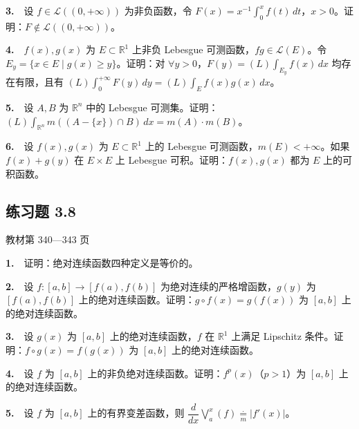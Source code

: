 \documentclass[11pt,a4paper]{article}
\begin{document}
\par{}\noindent \textbf{3.}　设 \(f\in\mathcal L((0,+\infty))\) 为非负函数，令 \(F(x)=x^{-1}\int_0^x f(t)\,dt\)，\(x>0\)。证明：\(F\notin\mathcal L((0,+\infty))\)。

\par{}\noindent \textbf{4.}　\(f(x),g(x)\) 为 \(E\subset\mathbb R^1\) 上非负 Lebesgue 可测函数，\(fg\in\mathcal L(E)\)。令 \(E_y=\{x\in E\mid g(x)\ge y\}\)。证明：对 \(\forall y>0\)，\(F(y)=(L)\int_{E_y} f(x)\,dx\) 均存在有限，且有 \((L)\int_0^{+\infty}F(y)\,dy=(L)\int_E f(x)g(x)\,dx\)。

\par{}\noindent \textbf{5.}　设 \(A,B\) 为 \(\mathbb R^n\) 中的 Lebesgue 可测集。证明：\((L)\int_{\mathbb R^n}m((A-\{x\})\cap B)\,dx=m(A)\cdot m(B)\)。

\par{}\noindent \textbf{6.}　设 \(f(x),g(x)\) 为 \(E\subset\mathbb R^1\) 上的 Lebesgue 可测函数，\(m(E)<+\infty\)。如果 \(f(x)+g(y)\) 在 \(E\times E\) 上 Lebesgue 可积。证明：\(f(x),g(x)\) 都为 \(E\) 上的可积函数。


\hypertarget{ex8}{}\subsection*{练习题 3.8}
\noindent 教材第 340—343 页

\par{}\noindent \textbf{1.}　证明：绝对连续函数四种定义是等价的。

\par{}\noindent \textbf{2.}　设 \(f:[a,b]\to[f(a),f(b)]\) 为绝对连续的严格增函数，\(g(y)\) 为 \([f(a),f(b)]\) 上的绝对连续函数。证明：\(g\circ f(x)=g(f(x))\) 为 \([a,b]\) 上的绝对连续函数。

\par{}\noindent \textbf{3.}　设 \(g(x)\) 为 \([a,b]\) 上的绝对连续函数，\(f\) 在 \(\mathbb R^1\) 上满足 Lipschitz 条件。证明：\(f\circ g(x)=f(g(x))\) 为 \([a,b]\) 上的绝对连续函数。

\par{}\noindent \textbf{4.}　设 \(f\) 为 \([a,b]\) 上的非负绝对连续函数。证明：\(f^p(x)\)（\(p>1\)）为 \([a,b]\) 上的绝对连续函数。

\par{}\noindent \textbf{5.}　设 \(f\) 为 \([a,b]\) 上的有界变差函数，则 \(\dfrac d{dx}\bigvee_a^x(f)\underset{m}{\overset{\cdot}{=}}|f'(x)|\)。
\end{document}
